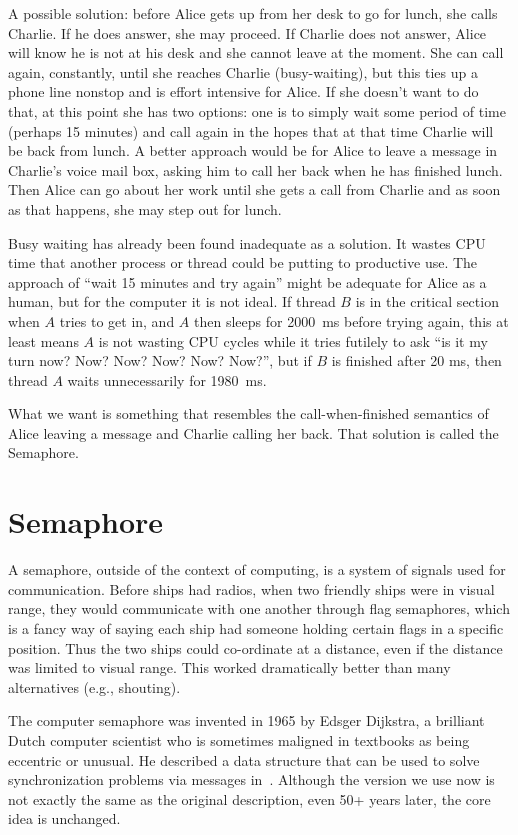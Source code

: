 \documentclass[a4paper]{report}
\begin{document}
A possible solution: before Alice gets up from her desk to go for lunch, she calls Charlie. If he does answer, she may proceed. If Charlie does not answer, Alice will know he is not at his desk and she cannot leave at the moment. She can call again, constantly, until she reaches Charlie (busy-waiting), but this ties up a phone line nonstop and is effort intensive for Alice. If she doesn't want to do that, at this point she has two options: one is to simply wait some period of time (perhaps 15 minutes) and call again in the hopes that at that time Charlie will be back from lunch. A better approach would be for Alice to leave a message in Charlie's voice mail box, asking him to call her back when he has finished lunch. Then Alice can go about her work until she gets a call from Charlie and as soon as that happens, she may step out for lunch.

Busy waiting has already been found inadequate as a solution. It wastes CPU time that another process or thread could be putting to productive use. The approach of ``wait 15 minutes and try again'' might be adequate for Alice as a human, but for the computer it is not ideal. If thread $B$ is in the critical section when $A$ tries to get in, and $A$ then sleeps for 2000~ms before trying again, this at least means $A$ is not wasting CPU cycles while it tries futilely to ask ``is it my turn now? Now? Now? Now? Now? Now?'', but if $B$ is finished after 20 ms, then thread $A$ waits unnecessarily for 1980~ms.

What we want is something that resembles the call-when-finished semantics of Alice leaving a message and Charlie calling her back. That solution is called the Semaphore.

\section*{Semaphore}
A semaphore, outside of the context of computing, is a system of signals used for communication. Before ships had radios, when two friendly ships were in visual range, they would communicate with one another through flag semaphores, which is a fancy way of saying each ship had someone holding certain flags in a specific position. Thus the two ships could co-ordinate at a distance, even if the distance was limited to visual range. This worked dramatically better than many alternatives (e.g., shouting).

The computer semaphore was invented in 1965 by Edsger Dijkstra, a brilliant Dutch computer scientist who is sometimes maligned in textbooks as being eccentric or unusual.  He described a data structure that can be used to solve synchronization problems via messages in~\cite{semaphores}. Although the version we use now is not exactly the same as the original description, even 50+ years later, the core idea is unchanged.
\end{document}
